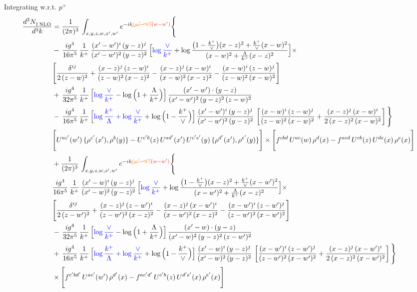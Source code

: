 \documentclass[9pt]{article}
\numberwithin{equation}{section}
\begin{document}
Integrating w.r.t. $p^{+}$ 
\begin{align}
 \frac{d^{3}N_{1\,\rm NLO}^{\rm}}{d^{3}k}  & =    \frac{1}{(2\pi)^{3}}\,\int_{x,y,z,w,x',w^{\prime}} e^{-ik{\color{orange}\cancel{(w^{\prime}-w)}}{\color{red}(w-w^{\prime})}}\Bigg\{ \notag \\ & -\, \frac{ig^{4}}{16\pi^{5}}\,\frac{1}{k^{+}}\, \frac{(x'-w')^{i}\,(y-z)^{j}}{(x'-w')^{2}\,(y-z)^{2}}\,\Big[{\color{blue}\log\frac{\vee}{k^{+}}}+\log\frac{\big(1-\frac{k^{+}}{\vee}\big)(x-z)^{2}+\frac{k^{+}}{\vee}(x-w)^{2}}{(x-w)^{2}+\frac{\Lambda}{k^{+}}(x-z)^{2}}\Big]\times\notag \\ &  \Bigg[\frac{\delta^{ij}}{2\,(z-w)^{2}}+\frac{(x-z)^{j}\,(z-w)^{i}}{(z-w)^{2}\,(x-z)^{2}}-\frac{(x-z)^{j}\,(x-w)^{i}}{(x-w)^{2}\,(x-z)^{2}}-\frac{(x-w)^{i}\,(z-w)^{j}}{(z-w)^{2}\,(x-w)^{2}}\Bigg]\notag \\ & +\,\frac{ig^{4}}{32\pi^{5}}\,\frac{1}{k^{+}}\,\Big[{\color{blue}\log\frac{\vee}{k^{+}}}-\log\Big(1+\frac{\Lambda}{k^{+}}\Big)\Big]\, \frac{(x'-w')\cdot (y-z)}{(x'-w')^{2}\,(y-z)^{2}\,(z-w)^{2}}\notag \\ & -\, \frac{ig^{4}}{16\pi^{5}}\,\frac{1}{k^{+}}\,\Big[{\color{blue}\log\frac{k^{+}}{\Lambda}+\log\frac{\vee}{k^{+}}}+\log\Big(1-\frac{k^{+}}{\vee}\Big)\Big]\,\frac{(x'-w')^{i}\,(y-z)^{j}}{(x'-w')^{2}\,(y-z)^{2}}\,\left[\frac{(x-w)^{i}\,(z-w)^{j}}{(z-w)^{2}\,(x-w)^{2}}+\frac{(x-z)^{j}\,(x-w)^{i}}{2\,(x-z)^{2}\, (x-w)^{2}}\right]\Bigg\} \notag \\ & \Bigg[U^{ac'}(w')\,\{\rho^{c'}(x'),\rho^{b}(y)\}-U^{c'b}(z)\,U^{ad'}(x')\,U^{c'e'}(y)\, \{\rho^{d'}(x'),\rho^{e'}(y)\}\Bigg]\times \Bigg[f^{cbd}\,U^{ac}(w)\,\rho^{d}(x)-f^{acd}\, U^{cb}(z)\,U^{de}(x)\,\rho^{e}(x)\Bigg]\notag \\ & + \frac{1}{(2\pi)^{3}}\,\int_{x,y,z,w,x',w^{\prime}} e^{-ik{\color{orange}\cancel{(w^{\prime}-w)}}{\color{red}(w-w^{\prime})}}\Bigg\{ \notag \\ &  \frac{ig^{4}}{16\pi^{5}}\,\frac{1}{k^{+}}\, \frac{(x'-w)^{i}\,(y-z)^{j}}{(x'-w)^{2}\,(y-z)^{2}}\,\Big[{\color{blue}\log\frac{\vee}{k^{+}}}+\log\frac{\big(1-\frac{k^{+}}{\vee}\big)(x-z)^{2}+\frac{k^{+}}{\vee}(x-w')^{2}}{(x-w')^{2}+\frac{\Lambda}{k^{+}}(x-z)^{2}}\Big]\times\notag \\ &  \Bigg[\frac{\delta^{ij}}{2\,(z-w')^{2}}+\frac{(x-z)^{j}\,(z-w')^{i}}{(z-w')^{2}\,(x-z)^{2}}-\frac{(x-z)^{j}\,(x-w')^{i}}{(x-w')^{2}\,(x-z)^{2}}-\frac{(x-w')^{i}\,(z-w')^{j}}{(z-w')^{2}\,(x-w')^{2}}\Bigg]\notag \\ & -\,\frac{ig^{4}}{32\pi^{5}}\,\frac{1}{k^{+}}\,\Big[{\color{blue}\log\frac{\vee}{k^{+}}}-\log\Big(1+\frac{\Lambda}{k^{+}}\Big)\Big]\, \frac{(x'-w)\cdot (y-z)}{(x'-w)^{2}\,(y-z)^{2}\,(z-w')^{2}}\notag \\ & +\,\frac{ig^{4}}{16\pi^{5}}\,\frac{1}{k^{+}}\,\Big[{\color{blue}\log\frac{k^{+}}{\Lambda}+\log\frac{\vee}{k^{+}}}+\log\Big(1-\frac{k^{+}}{\vee}\Big)\Big]\,\frac{(x'-w)^{i}\,(y-z)^{j}}{(x'-w)^{2}\,(y-z)^{2}}\,\left[\frac{(x-w')^{i}\,(z-w')^{j}}{(z-w')^{2}\,(x-w')^{2}}+\frac{(x-z)^{j}\,(x-w')^{i}}{2\,(x-z)^{2}\, (x-w')^{2}}\right] \Bigg\} \notag \\ & \times\Bigg[f^{c'bd'}\,U^{ac'}(w')\,\rho^{d'}(x)-f^{ac'd'}\, U^{c'b}(z)\,U^{d'e'}(x)\,\rho^{e'}(x)\Bigg] 
\end{align}
\end{document}
